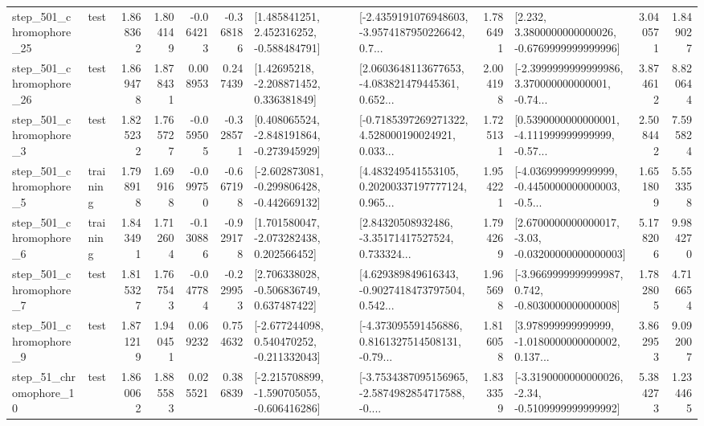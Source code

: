 \begin{tabular}{llrrrrllrlrr}
  step\_501\_chromophore\_25 &      test &      1.868362 &    1.804149 &     -0.064213 & -0.368186 &    [1.485841251, 2.452316252, -0.588484791] &  [-2.4359191076948603, -3.9574187950226642, 0.7... &       1.786491 &   [2.232, 3.3800000000000026, -0.6769999999999996] &            3.040571 &          1.849027 \\
  step\_501\_chromophore\_26 &      test &      1.869478 &    1.878431 &      0.008953 &  0.247439 &     [1.42695218, -2.208871452, 0.336381849] &  [2.0603648113677653, -4.083821479445361, 0.652... &       2.004198 &  [-2.3999999999999986, 3.370000000000001, -0.74... &            3.874612 &          8.820644 \\
   step\_501\_chromophore\_3 &      test &      1.825232 &    1.765727 &     -0.059505 & -0.328571 &   [0.408065524, -2.848191864, -0.273945929] &  [-0.7185397269271322, 4.528000190024921, 0.033... &       1.725131 &  [0.5390000000000001, -4.111999999999999, -0.57... &            2.508442 &          7.595824 \\
   step\_501\_chromophore\_5 &  training &      1.798918 &    1.699168 &     -0.099750 & -0.667198 &  [-2.602873081, -0.299806428, -0.442669132] &  [4.483249541553105, 0.20200337197777124, 0.965... &       1.954221 &  [-4.036999999999999, -0.4450000000000003, -0.5... &            1.651809 &          5.553358 \\
   step\_501\_chromophore\_6 &  training &      1.843491 &    1.712604 &     -0.130886 & -0.929178 &    [1.701580047, -2.073282438, 0.202566452] &  [2.84320508932486, -3.35171417527524, 0.733324... &       1.794269 &  [2.6700000000000017, -3.03, -0.03200000000000003] &            5.178206 &          9.984270 \\
   step\_501\_chromophore\_7 &      test &      1.815327 &    1.767543 &     -0.047784 & -0.229953 &    [2.706338028, -0.506836749, 0.637487422] &  [4.629389849616343, -0.9027418473797504, 0.542... &       1.965698 &  [-3.9669999999999987, 0.742, -0.8030000000000008] &            1.782805 &          4.716654 \\
   step\_501\_chromophore\_9 &      test &      1.871219 &    1.940451 &      0.069232 &  0.754632 &   [-2.677244098, 0.540470252, -0.211332043] &  [-4.373095591456886, 0.8161327514508131, -0.79... &       1.816058 &  [3.978999999999999, -1.0180000000000002, 0.137... &            3.862953 &          9.092007 \\
   step\_51\_chromophore\_10 &      test &      1.860062 &    1.885583 &      0.025521 &  0.386839 &  [-2.215708899, -1.590705055, -0.606416286] &  [-3.7534387095156965, -2.5874982854717588, -0.... &       1.833359 &  [-3.3190000000000026, -2.34, -0.5109999999999992] &            5.384273 &          1.234465 \\

\end{tabular}
